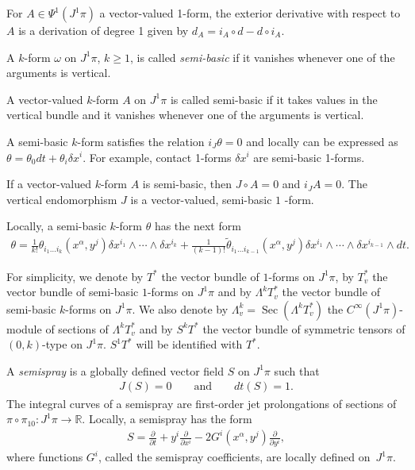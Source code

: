 \documentclass[pdftex]{sigma}
\begin{document}
\begin{remark}
For $A\in\Psi^{1}(J^{1}\pi)$ a vector-valued 1-form, the exterior
derivative with respect to $A$ is a derivation of degree 1 given
by $d_{A}=i_{A}\circ d-d\circ i_{A}.$
\end{remark}
A $k$-form $\omega$ on $J^{1}\pi$, $k\geq1$, is called \emph{semi-basic}
if it vanishes whenever one of the arguments is vertical.

A vector-valued $k$-form $A$ on $J^{1}\pi$ is called semi-basic
if it takes values in the vertical bundle and it vanishes whenever
one of the arguments is vertical.

A semi-basic $k$-form satisf\/ies the relation $i_{J}\theta=0$ and
locally can be expressed as $\theta=\theta_{0}dt+\theta_{i}\delta x^{i}$.
For example, contact 1-forms $\delta x^{i}$ are semi-basic 1-forms.

If a vector-valued $k$-form $A$ is semi-basic, then $J\circ A=0$
and $i_{J}A=0$. The vertical endomorphism $J$ is a vector-valued,
semi-basic $1$ -form.

Locally, a semi-basic $k$-form $\theta$ has the next form \begin{eqnarray*}
\theta=\frac{1}{k!}\theta_{i_{1}\dots i_{k}}(x^{\alpha},y^{j})\delta x^{i_{1}}\wedge\cdots\wedge\delta x^{i_{k}}+\frac{1}{(k-1)!}\widetilde{\theta}_{i_{1}\dots i_{k-1}}(x^{\alpha},y^{j})\delta x^{i_{1}}\wedge\cdots\wedge\delta x^{i_{k-1}}\wedge dt.\end{eqnarray*}


For simplicity, we denote by $T^{*}$ the vector bundle of $1$-forms
on $J^{1}\pi$, by $T_{v}^{*}$ the vector bundle of semi-basic $1$-forms
on $J^{1}\pi$ and by $\Lambda^{k}T_{v}^{*}$ the vector bundle of
semi-basic $k$-forms on $J^{1}\pi$. We also denote by $\Lambda_{v}^{k}=\operatorname{Sec}\left(\Lambda^{k}T_{v}^{*}\right)$
the $C^{\infty}(J^{1}\pi)$-module of sections of $\Lambda^{k}T_{v}^{*}$
and by $S^{k}T^{*}$ the vector bundle of symmetric tensors of $(0,k)$-type
on $J^{1}\pi$. $S^{1}T^{*}$ will be identif\/ied with $T^{*}$.

A \emph{semispray} is a globally def\/ined vector f\/ield $S$ on $J^{1}\pi$
such that \begin{gather*}
J(S)=0\qquad\textrm{and}\qquad dt(S)=1.%
\end{gather*}
 The integral curves of a semispray are f\/irst-order jet prolongations
of sections of $\pi\circ\pi_{10}:\!  J^{1}\pi\!\rightarrow\!\mathbb{R}$.
Locally, a semispray has the form{\samepage \begin{gather}
S=\frac{\partial}{\partial t}+y^{i}\frac{\partial}{\partial x^{i}}-2G^{i}(x^{\alpha},y^{j})\frac{\partial}{\partial y^{i}},\label{eq:5}
\end{gather}
 where functions $G^{i}$, called the semispray coef\/f\/icients, are
locally def\/ined on~$J^{1}\pi$.}
\end{document}
